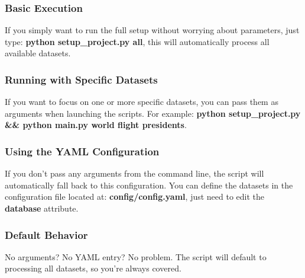 \documentclass[12pt,a4paper]{article}
\begin{document}
\subsubsection{Basic Execution}
If you simply want to run the full setup without worrying about parameters, just type: \textbf{python setup\_project.py all}, this will automatically process all available datasets.
\subsubsection{Running with Specific Datasets}
If you want to focus on one or more specific datasets, you can pass them as arguments when launching the scripts. For example: \textbf{python setup\_project.py \&\&  python main.py world flight presidents}.
\subsubsection{Using the YAML Configuration}
If you don’t pass any arguments from the command line, the script will automatically fall back to this configuration.
You can define the datasets in the configuration file located at: \textbf{config/config.yaml}, just need to edit the \textbf{database} attribute.
\subsubsection{Default Behavior}
No arguments? No YAML entry? No problem. The script will default to processing all datasets, so you’re always covered.
\end{document}
